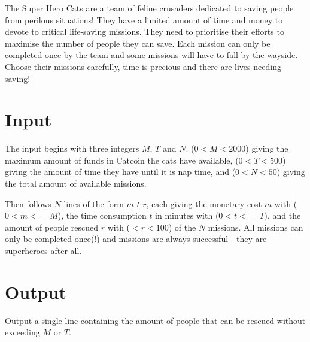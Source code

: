 


The Super Hero Cats are a team of feline crusaders dedicated to saving people from perilous situations!
They have a limited amount of time and money to devote to critical life-saving missions.
They need to prioritise their efforts to maximise the number of people they can save.
Each mission can only be completed once by the team and some missions will have to fall by the wayside.
Choose their missions carefully, time is precious and there are lives needing saving!

\section*{Input}

The input begins with three integers $M$, $T$ and $N$.
($0 < M < 2000$) giving the maximum amount of funds in Catcoin the cats have available, ($0 < T < 500$) giving the amount of time they have until it is nap time, and ($0 < N < 50$) giving the total amount of available missions.

Then follows $N$ lines of the form $m$ $t$ $r$, each giving the monetary cost $m$ with ($0 < m <= M$), the time consumption $t$ in minutes with ($0 < t <= T$), and the amount of people rescued $r$ with ($ < r < 100$) of the $N$ missions.
All missions can only be completed once(!) and missions are always successful - they are superheroes after all.

\section*{Output}

Output a single line containing the amount of people that can be rescued without exceeding $M$ or $T$.